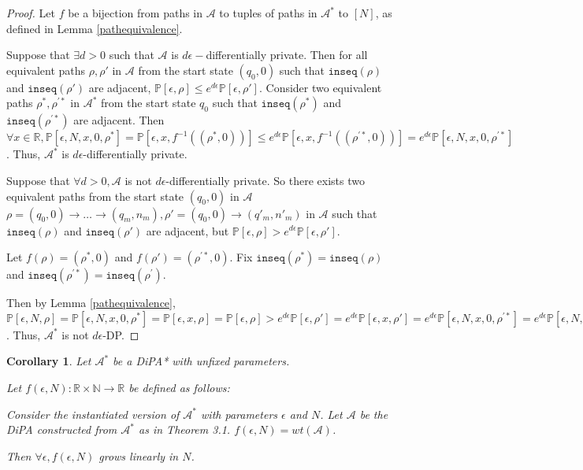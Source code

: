\documentclass[12pt]{article}
\newcommand{\NN}{\mathbb{N}}
\newcommand{\RR}{\mathbb{R}}
\newcommand{\PP}{\mathbb{P}}
\newtheorem{cor}[thm]{Corollary}
\theoremstyle{definition}
\begin{document}
\begin{proof}
	Let $f$ be a bijection from paths in $\mathcal{A}$ to tuples of paths in $\mathcal{A}^*$ to $[N]$, as defined in Lemma \ref{pathequivalence}.

	Suppose that $\exists d > 0$ such that $\mathcal{A}$ is $d\epsilon-$differentially private. Then for all equivalent paths $\rho, \rho'$ in $\mathcal{A}$ from the start state $(q_0, 0)$ such that $\texttt{inseq}(\rho)$ and $\texttt{inseq}(\rho')$ are adjacent, $\PP[\epsilon, \rho] \leq e^{d\epsilon} \PP[\epsilon, \rho']$.
	Consider two equivalent paths $\rho^*, \rho^{\prime *}$ in $\mathcal{A}^*$ from the start state $q_0$ such that $\texttt{inseq}(\rho^*)$ and $\texttt{inseq}(\rho^{\prime *})$ are adjacent. Then $\forall x\in \RR, \PP[\epsilon, N, x, 0, \rho^*] = \PP[\epsilon, x, f^{-1}((\rho^*, 0))] \leq e^{d\epsilon}\PP[\epsilon, x, f^{-1}((\rho^{\prime *}, 0))] = e^{d\epsilon}\PP[\epsilon, N, x, 0, \rho^{\prime *}]$. Thus, $\mathcal{A}^*$ is $d\epsilon$-differentially private.

	Suppose that $\forall d>0, \mathcal{A}$ is not $d\epsilon$-differentially private. So there exists two equivalent paths from the start state $(q_0, 0)$ in $\mathcal{A}$ $\rho = (q_0, 0)\to\ldots\to (q_m, n_m), \rho' = (q_0, 0) \to (q'_m, n'_m)$ in $\mathcal{A}$ such that $\texttt{inseq}(\rho)$ and $\texttt{inseq}(\rho')$ are adjacent, but $\PP[\epsilon, \rho] > e^{d\epsilon}\PP[\epsilon, \rho']$. 
	
	Let $f(\rho) = (\rho^*, 0)$ and $f(\rho') = (\rho^{\prime *}, 0)$. Fix $\texttt{inseq}(\rho^*) = \texttt{inseq}(\rho)$ and $\texttt{inseq}(\rho^{\prime *})=\texttt{inseq}(\rho^{\prime})$.

	Then by Lemma \ref{pathequivalence}, $\PP[\epsilon, N, \rho]=\PP[\epsilon, N, x, 0, \rho^*] = \PP[\epsilon, x, \rho] = \PP[\epsilon, \rho] > e^{d\epsilon}\PP[\epsilon, \rho'] = e^{d\epsilon}\PP[\epsilon, x, \rho'] = e^{d\epsilon}\PP[\epsilon, N, x, 0, \rho^{\prime *}]= e^{d\epsilon}\PP[\epsilon, N, \rho^{\prime *}]$. Thus, $\mathcal{A}^*$ is not $d\epsilon$-DP.
\end{proof}


\begin{cor}	

	Let $\mathcal{A}^*$ be a DiPA* with unfixed parameters.

	Let $f(\epsilon, N):\RR\times \NN \to \RR$ be defined as follows:

	Consider the instantiated version of $\mathcal{A}^*$ with parameters $\epsilon$ and $N$. Let $\mathcal{A}$ be the DiPA constructed from $\mathcal{A}^*$ as in Theorem 3.1. $f(\epsilon, N) = wt(\mathcal{A})$.

	Then $\forall \epsilon, f(\epsilon, N)$ grows linearly in $N$.
\end{cor}
\end{document}
